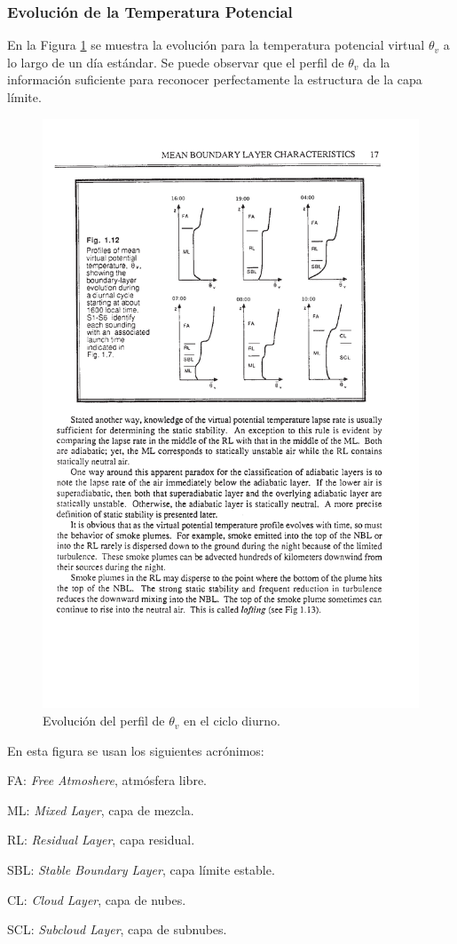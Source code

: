 \subsubsection{Evolución de la Temperatura Potencial}
En la Figura \ref{fig:03_pbl2} se muestra la evolución para la temperatura potencial virtual $\theta_v$ a lo largo de un día estándar. Se puede observar que el perfil de $\theta_v$ da la información suficiente para reconocer perfectamente la estructura de la capa límite. 
\begin{figure}[h!]
	\centering
	\includegraphics[width=0.7\linewidth,trim={5.6cm 14cm 2.7cm 3.3cm},clip]{Imagenes/03/pbl2}
	\caption{Evolución del perfil de $\theta_v$ en el ciclo diurno.}
	\label{fig:03_pbl2}
\end{figure}

En esta figura se usan los siguientes acrónimos:
\begin{itemize*}
	\item FA: \emph{Free Atmoshere}, atmósfera libre.
	\item ML: \emph{Mixed Layer}, capa de mezcla.
	\item RL: \emph{Residual Layer}, capa residual.
	\item SBL: \emph{Stable Boundary Layer}, capa límite estable.
	\item CL: \emph{Cloud Layer}, capa de nubes.
	\item SCL: \emph{Subcloud Layer}, capa de subnubes.
\end{itemize*}
